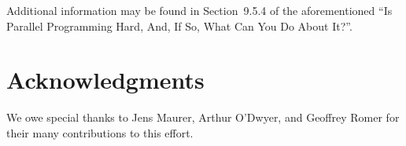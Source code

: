 Additional information may be found in Section~9.5.4 of the aforementioned
``Is Parallel Programming Hard, And, If So, What Can You Do About It?''.

\section{Acknowledgments}
\label{sec:Acknowledgments}

We owe special thanks to Jens Maurer, Arthur O'Dwyer, and Geoffrey Romer
for their many contributions to this effort.
